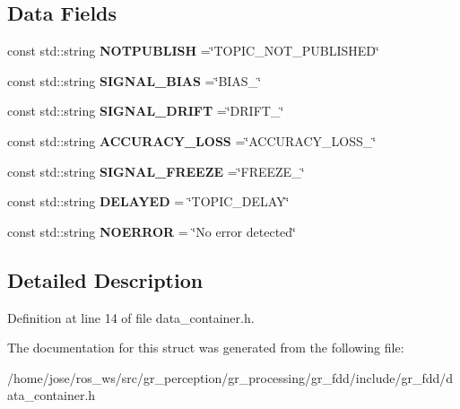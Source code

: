 \subsection*{Data Fields}
\begin{DoxyCompactItemize}
\item 
\mbox{\label{structgr__fdd_1_1ERRORID_acc158174e1ae440c1bdaba309d2837f7}} 
const std\+::string {\bfseries N\+O\+T\+P\+U\+B\+L\+I\+SH} =\char`\"{}T\+O\+P\+I\+C\+\_\+\+N\+O\+T\+\_\+\+P\+U\+B\+L\+I\+S\+H\+ED\char`\"{}
\item 
\mbox{\label{structgr__fdd_1_1ERRORID_ae4bc30a25bdb8838f566fca50fc0c211}} 
const std\+::string {\bfseries S\+I\+G\+N\+A\+L\+\_\+\+B\+I\+AS} =\char`\"{}B\+I\+A\+S\+\_\+\char`\"{}
\item 
\mbox{\label{structgr__fdd_1_1ERRORID_a44fd2ba7557ede2063c3a22e2e0f9bfb}} 
const std\+::string {\bfseries S\+I\+G\+N\+A\+L\+\_\+\+D\+R\+I\+FT} =\char`\"{}D\+R\+I\+F\+T\+\_\+\char`\"{}
\item 
\mbox{\label{structgr__fdd_1_1ERRORID_ae51569be6f43512de35c0b226e3186c3}} 
const std\+::string {\bfseries A\+C\+C\+U\+R\+A\+C\+Y\+\_\+\+L\+O\+SS} =\char`\"{}A\+C\+C\+U\+R\+A\+C\+Y\+\_\+\+L\+O\+S\+S\+\_\+\char`\"{}
\item 
\mbox{\label{structgr__fdd_1_1ERRORID_a6ba63d157a31cbb9cb4e2b442e997c17}} 
const std\+::string {\bfseries S\+I\+G\+N\+A\+L\+\_\+\+F\+R\+E\+E\+ZE} =\char`\"{}F\+R\+E\+E\+Z\+E\+\_\+\char`\"{}
\item 
\mbox{\label{structgr__fdd_1_1ERRORID_a7479e4f50668d1392809ec99ae0246fe}} 
const std\+::string {\bfseries D\+E\+L\+A\+Y\+ED} = \char`\"{}T\+O\+P\+I\+C\+\_\+\+D\+E\+L\+AY\char`\"{}
\item 
\mbox{\label{structgr__fdd_1_1ERRORID_a3947cccbc51d84bd5d2855f3f850c116}} 
const std\+::string {\bfseries N\+O\+E\+R\+R\+OR} = \char`\"{}No error detected\char`\"{}
\end{DoxyCompactItemize}


\subsection{Detailed Description}


Definition at line 14 of file data\+\_\+container.\+h.



The documentation for this struct was generated from the following file\+:\begin{DoxyCompactItemize}
\item 
/home/jose/ros\+\_\+ws/src/gr\+\_\+perception/gr\+\_\+processing/gr\+\_\+fdd/include/gr\+\_\+fdd/data\+\_\+container.\+h\end{DoxyCompactItemize}
